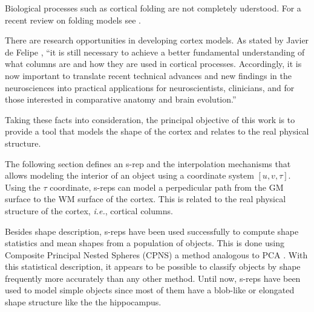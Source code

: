 \documentclass[a4paper,twoside]{article}
\begin{document}
%

Biological processes such as cortical folding are not completely uderstood. 
For a recent review on folding models see \cite{filas2013mechanisms}.

There are research opportunities in developing cortex models. 
As stated by Javier de Felipe \cite{defelipe2012neocortical}, ``it is still necessary
to achieve a better fundamental understanding of what columns
are and how they are used in cortical processes. Accordingly, it
is now important to translate recent technical advances and
new findings in the neurosciences into practical applications for
neuroscientists, clinicians, and for those interested in comparative
anatomy and brain evolution.''

Taking these facts into consideration, the principal objective of this work is to provide a
tool that models the shape of the cortex and relates to the real physical structure. 

The following section defines an s-rep and the interpolation mechanisms that allows modeling the 
interior of an object using a coordinate system $[u, v, \tau]$.
Using the $\tau$ coordinate, s-reps can model a perpedicular path from the GM surface to the WM surface of the cortex. This is related to the real physical structure of the cortex, \textit{i.e.}, cortical columns. 

Besides shape description, s-reps have been used successfully to compute shape statistics and mean shapes from a population of objects. 
This is done using Composite Principal Nested Spheres (CPNS) a method analogous to PCA \cite{pizer_nested_2012}.
With this statistical description, it appears to be possible to classify objects by shape frequently more accurately than any other method.
Until now, s-reps have been used to model simple objects since most of them have a 
blob-like or elongated shape structure like the the hippocampus.
\end{document}
